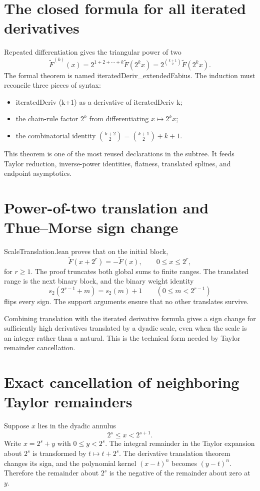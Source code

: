 \documentclass[11pt,a4paper,openany]{book}
\def\module#1{#1.lean}
\def\decl#1{#1}
\def\code#1{#1}
\newcommand{\module}[1]{\nolinkurl{#1.lean}}
\newcommand{\decl}[1]{\texttt{\detokenize{#1}}}
\newcommand{\code}[1]{\texttt{\detokenize{#1}}}
\begin{document}
\section{The closed formula for all iterated derivatives}
Repeated differentiation gives the triangular power of two
\[
 \widetilde F^{(k)}(x)
 =2^{1+2+\cdots+k}\widetilde F(2^k x)
 =2^{\binom{k+1}{2}}\widetilde F(2^k x).
\]
The formal theorem is named \decl{iteratedDeriv_extendedFabius}.  The induction
must reconcile three pieces of syntax:
\begin{itemize}
  \item \code{iteratedDeriv (k+1)} as a derivative of
        \code{iteratedDeriv k};
  \item the chain-rule factor $2^k$ from differentiating $x\mapsto2^kx$;
  \item the combinatorial identity
        $\binom{k+2}{2}=\binom{k+1}{2}+k+1$.
\end{itemize}
This theorem is one of the most reused declarations in the subtree.  It feeds
Taylor reduction, inverse-power identities, flatness, translated splines, and
endpoint asymptotics.

\section{Power-of-two translation and Thue--Morse sign change}
\module{ScaleTranslation} proves that on the initial block,
\[
 \widetilde F(x+2^r)=-\widetilde F(x),
 \qquad 0\le x\le2^r,
\]
for $r\ge1$.  The proof truncates both global sums to finite ranges.  The
translated range is the next binary block, and the binary weight identity
\[
 s_2(2^{r-1}+m)=s_2(m)+1
 \qquad(0\le m<2^{r-1})
\]
flips every sign.  The support arguments ensure that no other translates
survive.

Combining translation with the iterated derivative formula gives a sign change
for sufficiently high derivatives translated by a dyadic scale, even when the
scale is an integer rather than a natural.  This is the technical form needed
by Taylor remainder cancellation.

\section{Exact cancellation of neighboring Taylor remainders}
Suppose $x$ lies in the dyadic annulus
\[
 2^s\le x<2^{s+1}.
\]
Write $x=2^s+y$ with $0\le y<2^s$.  The integral remainder in the Taylor
expansion about $2^s$ is transformed by $t\mapsto t+2^s$.  The derivative
translation theorem changes its sign, and the polynomial kernel
$(x-t)^n$ becomes $(y-t)^n$.  Therefore the remainder about $2^s$ is the
negative of the remainder about zero at $y$.
\end{document}

